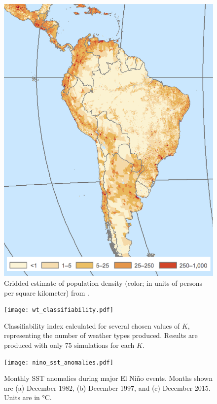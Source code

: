 \documentclass{article}
\begin{document}
\begin{figure}
	\centering
  \includegraphics[width=\textwidth,height=0.6\textheight,keepaspectratio=true]{gpw-v4-2015.png}
	\caption{
		Gridded estimate of population density (color; in units of persons per square kilometer) from \citet{GPWv4}.
	}
\end{figure}

\begin{figure}
  \texttt{[image: wt\_classifiability.pdf]}
	\caption{
		Classifiability index \citep[see Methods and][]{Michelangeli1995} calculated for several chosen values of $K$, representing the number of weather types produced.
		Results are produced with only 75 simulations for each $K$.
	}
\end{figure}

\begin{figure}
	\texttt{[image: nino\_sst\_anomalies.pdf]}
	\caption{
		Monthly SST anomalies during major El Ni\~{n}o events.
		Months shown are (a) December 1982, (b) December 1997, and (c) December 2015.
		Units are in \si{\celsius}.
	}
\end{figure}

\clearpage


\end{document}
